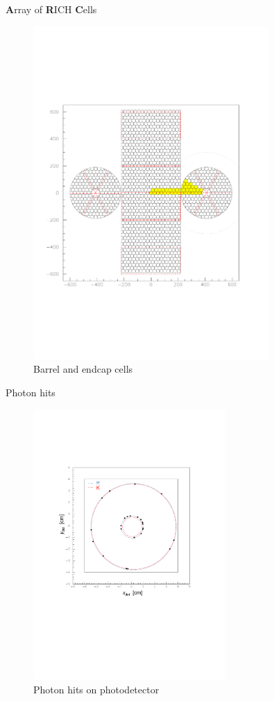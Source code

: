 \documentclass{beamer}
\begin{document}
\begin{frame}{\textbf{A}rray of \textbf{R}ICH \textbf{C}ells}
  \begin{figure}
    \includegraphics[width = 0.8\textwidth, trim = {0 7cm 0 7cm}, clip = true]{Plots/Display3.pdf}
    \caption{Barrel and endcap cells}
  \end{figure}
\end{frame}

\begin{frame}{Photon hits}
  \begin{figure}
    \centering
    \includegraphics[width = 0.65\textwidth, trim = {2cm 9cm 3cm 6cm}, clip = true]{Plots/Display1.pdf}
    \caption{Photon hits on photodetector}
  \end{figure}
\end{frame}
\end{document}

